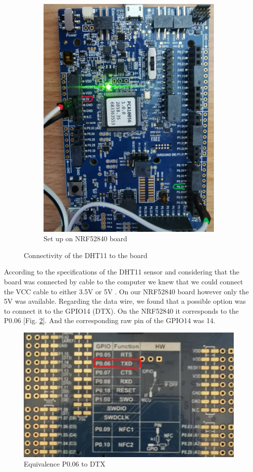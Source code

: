 \begin{figure}
\begin{subfigure}[b]{0.45\columnwidth}
        \includegraphics[width=\columnwidth]{images/ConnectivityToBoard.jpeg}
        \caption{Set up on NRF52840 board}
    \end{subfigure}
    \caption{Connectivity of the DHT11 to the board}
    \label{fig:connectionDHT11}
\end{figure}

According to the specifications of the DHT11 sensor and considering that the board was connected by cable to the computer we
knew that we could connect the VCC cable to either 3.5V or 5V \cite{b1}. On our NRF52840 board however only the 5V was available. 
Regarding the data wire, we found that a possible option was to connect it to the GPIO14 (DTX)\cite{b2}. On the NRF52840 it corresponds to the P0.06 [Fig. \ref{fig:DTX}]. And the corresponding raw pin of the GPIO14 was 14. 

\begin{figure}[!ht]%
    \centering
    \includegraphics[scale=0.2]{images/GPIO14Arduino.jpg}%
    \caption{Equivalence P0.06 to DTX}%
    \label{fig:DTX}%
\end{figure}
